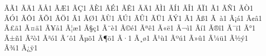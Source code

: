 {        {^^c3^^83}{{\~{A}}}1  %
        {^^c3^^84}{{\"{A}}}1  %
        {^^c3^^85}{{\AA}}1  %
        {^^c3^^86}{{\AE}}1  %
        {^^c3^^87}{{\c{C}}}1  %
        {^^c3^^88}{{\`{E}}}1  %
        {^^c3^^89}{{\'{E}}}1  %
        {^^c3^^8a}{{\^{E}}}1  %
        {^^c3^^8b}{{\"{A}}}1  %
        {^^c3^^8c}{{\`{I}}}1  %
        {^^c3^^8d}{{\'{I}}}1  %
        {^^c3^^8e}{{\^{I}}}1  %
        {^^c3^^8f}{{\"{I}}}1  %
        {^^c3^^90}{{\DH}}1  %
        {^^c3^^91}{{\~{N}}}1  %
        {^^c3^^92}{{\`{O}}}1  %
        {^^c3^^93}{{\'{O}}}1  %
        {^^c3^^94}{{\^{O}}}1  %
        {^^c3^^95}{{\~{O}}}1  %
        {^^c3^^96}{{\"{O}}}1  %
        {^^c3^^97}{{\texttimes}}1  %
        {^^c3^^98}{{\O}}1  %
        {^^c3^^99}{{\`{U}}}1  %
        {^^c3^^9a}{{\'{U}}}1  %
        {^^c3^^9b}{{\^{U}}}1  %
        {^^c3^^9c}{{\"{U}}}1  %
        {^^c3^^9d}{{\'{Y}}}1  %
        {^^c3^^9e}{{\TH}}1  %
        {^^c3^^9f}{{\ss}}1  %
        {^^c3^^a0}{{\`{a}}}1  %
        {^^c3^^a1}{{\'{a}}}1  %
        {^^c3^^a2}{{\^{a}}}1  %
        {^^c3^^a3}{{\~{a}}}1  %
        {^^c3^^a4}{{\"{a}}}1  %
        {^^c3^^a5}{{\aa}}1  %
        {^^c3^^a6}{{\ae}}1  %
        {^^c3^^a7}{{\c{c}}}1  %
        {^^c3^^a8}{{\`{e}}}1  %
        {^^c3^^a9}{{\'{e}}}1  %
        {^^c3^^aa}{{\^{e}}}1  %
        {^^c3^^ab}{{\"{e}}}1  %
        {^^c3^^ac}{{\`{i}}}1  %
        {^^c3^^ad}{{\'{i}}}1  %
        {^^c3^^ae}{{\^{i}}}1  %
        {^^c3^^af}{{\"{i}}}1  %
        {^^c3^^b0}{{\DH}}1  %
        {^^c3^^b1}{{\~{n}}}1  %
        {^^c3^^b2}{{\`{o}}}1  %
        {^^c3^^b3}{{\'{o}}}1  %
        {^^c3^^b4}{{\^{o}}}1  %
        {^^c3^^b5}{{\~{o}}}1  %
        {^^c3^^b6}{{\"{o}}}1  %
        {^^c3^^b7}{{\textdiv}}1  %
        {^^c3^^b8}{{\o}}1  %
        {^^c3^^b9}{{\`{u}}}1  %
        {^^c3^^ba}{{\'{u}}}1  %
        {^^c3^^bb}{{\^{u}}}1  %
        {^^c3^^bc}{{\"{u}}}1  %
        {^^c3^^bd}{{\'{y}}}1  %
        {^^c3^^be}{{\th}}1  %
        {^^c3^^bf}{{\"{y}}}1  %
}

